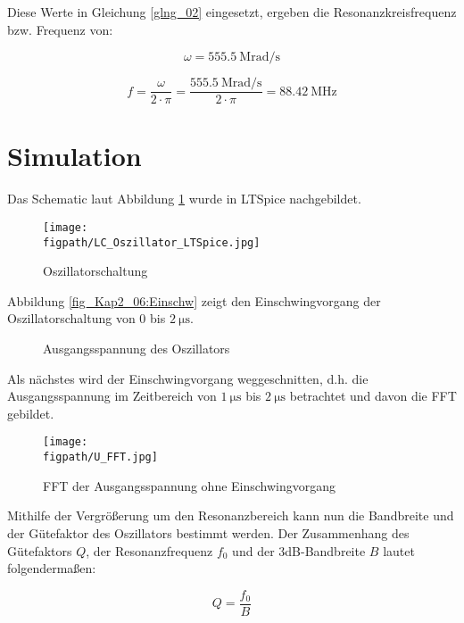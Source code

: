 Diese Werte in Gleichung \ref{glng_02} eingesetzt, ergeben die Resonanzkreisfrequenz bzw. Frequenz von:

\begin{equation}
    \omega = \SI{555.5}{\mega \radian \per \second}
\end{equation}

\begin{equation}
    f = \frac{\omega}{2 \cdot \pi} = \frac{\SI{555.5}{\mega \radian \per \second}}{2 \cdot \pi} = \SI{88.42}{\mega \hertz}
\end{equation}


\section{Simulation}
Das Schematic laut Abbildung \ref{fig_Kap2_05:LTSpiceSchematic} wurde in LTSpice nachgebildet.

\begin{figure}[H]
    \centering
    \texttt{[image: \\figpath/LC\_Oszillator\_LTSpice.jpg]}
    \caption{Oszillatorschaltung}
    \label{fig_Kap2_05:LTSpiceSchematic}
\end{figure}

Abbildung \ref{fig_Kap2_06:Einschw} zeigt den Einschwingvorgang der Oszillatorschaltung von 0 bis $\SI{2}{\micro\second}$. 

\begin{figure}[H]
	\centering \small
	
	\caption{Ausgangsspannung des Oszillators}
	\label{fig_Kap2_06:Uout}
\end{figure}

Als nächstes wird der Einschwingvorgang weggeschnitten, d.h. die Ausgangsspannung im Zeitbereich von $\SI{1}{\micro\second}$ bis $\SI{2}{\micro\second}$ betrachtet und davon die FFT gebildet.

\begin{figure}[H]
    \centering
    \texttt{[image: \\figpath/U\_FFT.jpg]}
    \caption{FFT der Ausgangsspannung ohne Einschwingvorgang}
    \label{fig_Kap2_07:FFT}
\end{figure}

Mithilfe der Vergrößerung um den Resonanzbereich kann nun die Bandbreite und der Gütefaktor des Oszillators bestimmt werden. Der Zusammenhang des Gütefaktors $Q$, der Resonanzfrequenz $f_0$ und der 3dB-Bandbreite $B$ lautet folgendermaßen:

\begin{equation}
    Q = \frac{f_0}{B}
\end{equation}

